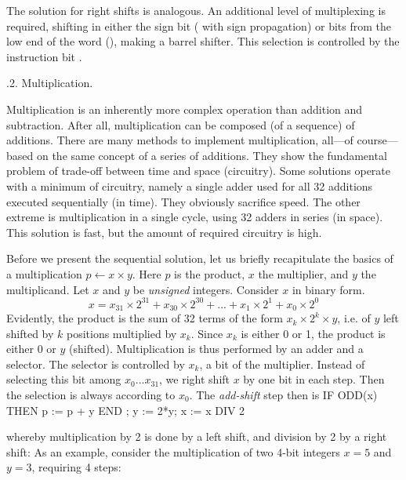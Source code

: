 The solution for right shifts is analogous. An additional level of multiplexing is required, shifting in either the sign bit ( with sign propagation) or bits from the low end of the word (), making a barrel shifter. This selection is controlled by the instruction bit .

.2. Multiplication.

Multiplication is an inherently more complex operation than addition and subtraction. After all, multiplication can be composed (of a sequence) of additions. There are many methods to implement multiplication, all---of course---based on the same concept of a series of additions. They show the fundamental problem of trade-off between time and space (circuitry). Some solutions operate with a minimum of circuitry, namely a single adder used for all 32 additions executed sequentially (in time). They obviously sacrifice speed. The other extreme is multiplication in a single cycle, using 32 adders in series (in space). This solution is fast, but the amount of required circuitry is high.

Before we present the sequential solution, let us briefly recapitulate the basics of a multiplication $p \gets x \times y$. Here $p$ is the product, $x$ the multiplier, and $y$ the multiplicand. Let $x$ and $y$ be \emph{unsigned} integers. Consider $x$ in binary form.
$$x = x_{31} \times 2^{31} + x_{30} \times 2^{30} + ... + x_1 \times 2^1 + x_0 \times 2^0$$
Evidently, the product is the sum of 32 terms of the form $x_k \times 2^k \times y$, i.e. of $y$ left shifted by $k$ positions multiplied by $x_k$. Since $x_k$ is either 0 or 1, the product is either 0 or $y$ (shifted). Multiplication is thus performed by an adder and a selector. The selector is controlled by $x_k$, a bit of the multiplier. Instead of selecting this bit among $x_0...x_{31}$, we right shift $x$ by one bit in each step. Then the selection is always according to $x_0$. The \emph{add-shift} step then is
\begintt
IF ODD(x) THEN p := p + y END ;
y := 2*y; x := x DIV 2
\endtt

\noindent whereby multiplication by 2 is done by a left shift, and division by 2 by a right shift: As an example, consider the multiplication of two 4-bit integers $x = 5$ and $y = 3$, requiring 4 steps:

\medskip
{}\medskip

